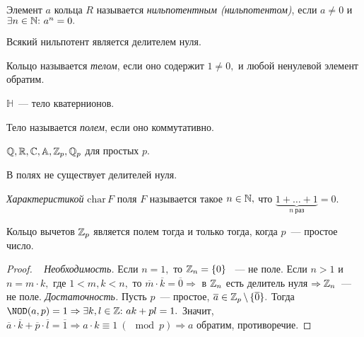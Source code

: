 	\begin{definition}
		Элемент $a$ кольца $R$ называется \textit{нильпотентным (нильпотентом)}, если ${a \neq 0}$ и ${\exists n \in \mathbb{N} {:}{ } \  a^n = 0.}$
	\end{definition}
	\begin{remark}
		Всякий нильпотент является делителем нуля.
	\end{remark}
	\begin{definition}
		Кольцо называется \textit{телом}, если оно содержит ${1 \neq 0,}$ и любой ненулевой элемент обратим.
        \begin{exmpl*}
            $\mathbb{H}$~--- тело кватернионов.
        \end{exmpl*}
	\end{definition}
        \begin{definition}
            Тело называется \textit{полем}, если оно коммутативно.
        \end{definition}
        \begin{exmpls}
		$\mathbb{Q}, \mathbb{R}, \mathbb{C}, \mathbb{A}, \mathbb{Z}_p, \mathbb{Q}_p$ для простых $p$.
	\end{exmpls}
	\begin{remark}
		В полях не существует делителей нуля.
	\end{remark}
        \begin{definition}
            \textit{Характеристикой} $\mathrm{char} \, F$ поля $F$ называется такое ${n \in \mathbb{N},}$ что ${\underbrace{1+\ldots+1}_{n \ \text{раз}} = 0.}$
        \end{definition}
        \newpage
	\begin{theorem}
		Кольцо вычетов  $\mathbb{Z}_p$ является полем тогда и только тогда, когда $p$~--- простое число.
	\end{theorem}
	\begin{proof}
		\
		\newline
		{\textit{Необходимость.}} Если ${n = 1,}$ то ${\mathbb{Z}_n = \{0\}}$ ~--- не поле. \n
		Если ${n > 1}$ и ${n = m \cdot k,}$  где ${1 < m, k < n,}$ то ${\overline{m} \cdot \overline{k} = \overline{0}} \Rightarrow$ в $\mathbb{Z}_n$ есть делитель нуля ${\Rightarrow \mathbb{Z}_n}$~--- не поле. \newline
		{\textit{Достаточность.}} Пусть $p$~--- простое, ${\overline{a} \in \mathbb{Z}_p \, \backslash \, \{\overline{0}\}.}$ \n
		Тогда ${{\NOD(a,p)} = 1} \Rightarrow {\exists k,l \in \integers \suchthat ak + pl = 1.}$ Значит, ${\overline{a} \cdot \overline{k} + \overline{p} \cdot \overline{l} = \overline{1} \Rightarrow a \cdot k \equiv 1 \ (\mod p) \Rightarrow a}$ обратим, противоречие.
	\end{proof}
